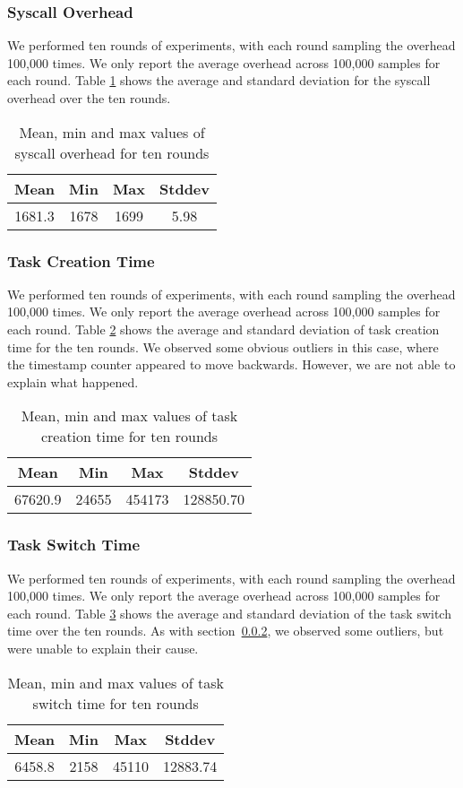 \subsubsection{Syscall Overhead}
We performed ten rounds of experiments, with each round sampling the
overhead 100,000 times.
%
We only report the average overhead across 100,000 samples for each
round.
%
Table \ref{tab:t3} shows the average and standard deviation for the
syscall overhead over the ten rounds.

\begin{table}[tb]

    \caption{Mean, min and max values of syscall overhead for ten rounds}
    
    \begin{tabular}{|c|c|c|c|} 
        \hline
        Mean & Min & Max & Stddev\\ 
        \hline
        1681.3 & 1678 & 1699 & 5.98\\ 
        \hline
       \end{tabular}
        \label{tab:t3}
\end{table}

    
\subsubsection{Task Creation Time}
\label{subsubsec:tct}
We performed ten rounds of experiments, with each round sampling the
overhead 100,000 times. %
We only report the average overhead across 100,000 samples for each
round. %
Table \ref{tab:t4} shows the average and standard deviation of task
creation time for the ten rounds. %
We observed some obvious outliers in this case, where the timestamp
counter appeared to move backwards. %
However, we are not able to explain what happened.

\begin{table}[htb]

    \caption{Mean, min and max values of task creation time for ten rounds}
\begin{tabular}{|c|c|c|c|} 
    \hline
    Mean & Min & Max & Stddev\\ 
    \hline
    67620.9 & 24655 & 454173 & 128850.70\\ 
    \hline
   \end{tabular}
    \label{tab:t4}
\end{table}

\subsubsection{Task Switch Time}
We performed ten rounds of experiments, with each round sampling the
overhead 100,000 times. %
We only report the average overhead across 100,000 samples for each
round. %
Table \ref{tab:t5} shows the average and standard deviation of the
task switch time over the ten rounds. %
As with section~\ref{subsubsec:tct}, we observed some outliers, but
were unable to explain their cause.

\begin{table}[htb]

    \caption{Mean, min and max values of task switch time for ten rounds}
 
\begin{tabular}{|c|c|c|c|} 
    \hline
    Mean & Min & Max & Stddev\\ 
    \hline
    6458.8 & 2158 & 45110 & 12883.74\\ 
    \hline
   \end{tabular}
    \label{tab:t5}
\end{table}
